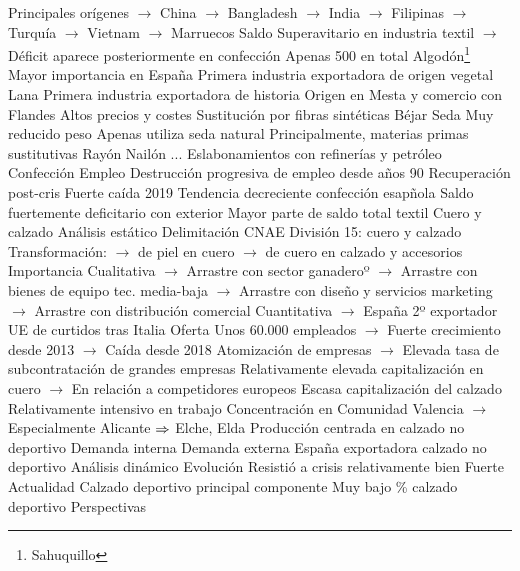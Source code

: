 \documentclass{nuevotema}
\begin{document}
\begin{esquemal}
				\4[] Principales orígenes
				\4[] $\to$ China
				\4[] $\to$ Bangladesh
				\4[] $\to$ India
				\4[] $\to$ Filipinas
				\4[] $\to$ Turquía
				\4[] $\to$ Vietnam
				\4[] $\to$ Marruecos
				\4 Saldo
				\4[] Superavitario en industria textil
				\4[] $\to$ Déficit aparece posteriormente en confección
				\4[] Apenas 500 en total
			\3 Algodón\footnote{Sahuquillo}
				\4 Mayor importancia en España
				\4 Primera industria exportadora de origen vegetal
			\3 Lana
				\4 Primera industria exportadora de historia
				\4 Origen en Mesta y comercio con Flandes
				\4 Altos precios y costes
				\4 Sustitución por fibras sintéticas
				\4 Béjar
			\3 Seda
				\4 Muy reducido peso
				\4 Apenas utiliza seda natural
				\4 Principalmente, materias primas sustitutivas
				\4[] Rayón
				\4[] Nailón
				\4[] ...
				\4 Eslabonamientos con refinerías y petróleo
			\3 Confección
				\4 Empleo
				\4[] Destrucción progresiva de empleo desde años 90
				\4[] Recuperación post-cris
				\4[] Fuerte caída 2019
				\4 Tendencia decreciente confección esapñola
				\4 Saldo fuertemente deficitario con exterior
				\4[] Mayor parte de saldo total textil
		\2 Cuero y calzado
			\3 Análisis estático
				\4 Delimitación
				\4[] CNAE División 15: cuero y calzado
				\4[] Transformación:
				\4[] $\to$ de piel en cuero
				\4[] $\to$ de cuero en calzado y accesorios
				\4 Importancia
				\4[] Cualitativa
				\4[] $\to$ Arrastre con sector ganaderoº
				\4[] $\to$ Arrastre con bienes de equipo tec. media-baja
				\4[] $\to$ Arrastre con diseño y servicios marketing
				\4[] $\to$ Arrastre con distribución comercial
				\4[] Cuantitativa
				\4[] $\to$ España 2º exportador UE de curtidos tras Italia
				\4 Oferta
				\4[] Unos 60.000 empleados
				\4[] $\to$ Fuerte crecimiento desde 2013
				\4[] $\to$ Caída desde 2018
				\4[] Atomización de empresas
				\4[] $\to$ Elevada tasa de subcontratación de grandes empresas
				\4[] Relativamente elevada capitalización en cuero
				\4[] $\to$ En relación a competidores europeos
				\4[] Escasa capitalización del calzado
				\4[] Relativamente intensivo en trabajo
				\4[] Concentración en Comunidad Valencia
				\4[] $\to$ Especialmente Alicante
				\4[] $\Rightarrow$ Elche, Elda
				\4[] Producción centrada en calzado no deportivo
				\4 Demanda interna
				\4 Demanda externa
				\4[] España exportadora calzado no deportivo
			\3 Análisis dinámico
				\4 Evolución
				\4[] Resistió a crisis relativamente bien
				\4[] Fuerte
				\4 Actualidad
				\4[] Calzado deportivo principal componente
				\4[] Muy bajo \% calzado deportivo
				\4 Perspectivas

\end{esquemal}
\end{document}
